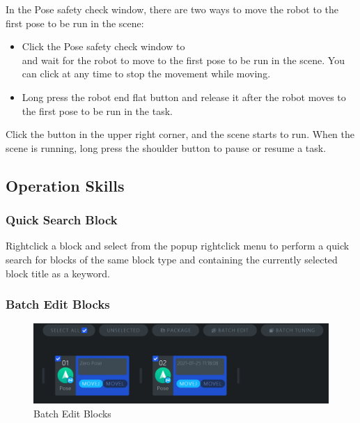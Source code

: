 In the Pose safety check window, there are two ways to move the robot to the first pose to be run in the scene:
\begin{itemize}
	\item Click the Pose safety check window to \\ and wait for the robot to move to the first pose to be run in the scene. You can click  at any time to stop the movement while moving.
	\item Long press the robot end flat button and release it after the robot moves to the first pose to be run in the task.
\end{itemize}

Click the  button in the upper right corner, and the scene starts to run. When the scene is running, long press the shoulder button to pause or resume a task.



\subsection{Operation Skills}
\subsubsection{Quick Search Block}
Right­click a block and select  from the pop­up right­click menu to perform a quick search for blocks of the same block type and containing the currently selected block title as a keyword.
\subsubsection{Batch Edit Blocks}

\begin{figure}[htb]
	\centering
	\includegraphics[width=\textwidth]{en/image/batch_adjust_positions.png}
	\caption{Batch Edit Blocks}
	\label{fig:批量编辑动作块}
\end{figure}

